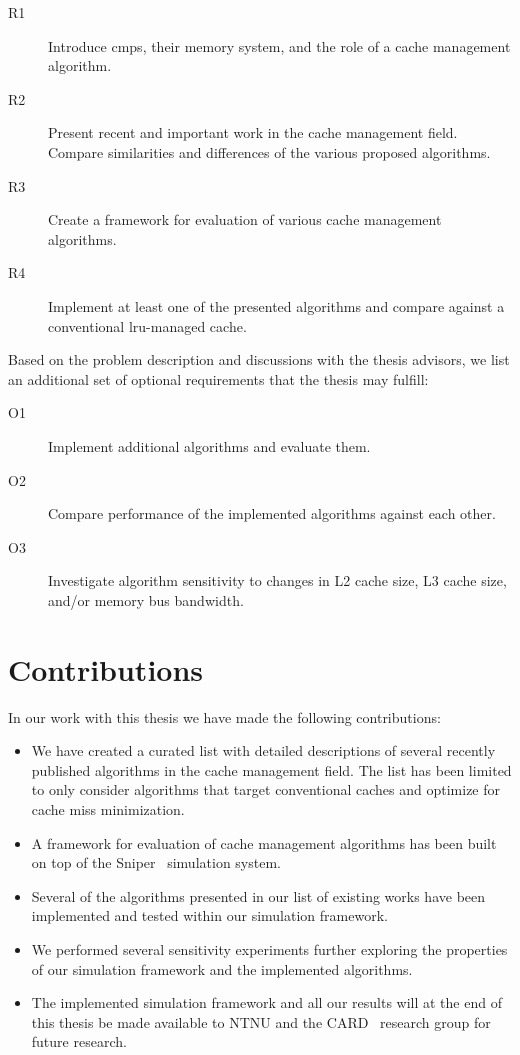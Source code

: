 \begin{description}
    \item[R1] Introduce \glspl{cmp}, their memory system, and the role of a cache management algorithm.
    \item[R2] Present recent and important work in the cache management field. Compare similarities and differences of the various proposed algorithms.
    \item[R3] Create a framework for evaluation of various cache management algorithms.
    \item[R4] Implement at least one of the presented algorithms and compare against a conventional \gls{lru}-managed cache.
\end{description}
Based on the problem description and discussions with the thesis advisors, we list an additional set of optional requirements that the thesis may fulfill:

\begin{description}
    \item[O1] Implement additional algorithms and evaluate them.
    \item[O2] Compare performance of the implemented algorithms against each other.
    \item[O3] Investigate algorithm sensitivity to changes in L2 cache size, L3 cache size, and/or memory bus bandwidth.
\end{description}

\section{Contributions}

In our work with this thesis we have made the following contributions:

\begin{itemize}
  \item We have created a curated list with detailed descriptions of several recently published algorithms in the cache management field. The list has been limited to only consider algorithms that target conventional caches and optimize for cache miss minimization.
  \item A framework for evaluation of cache management algorithms has been built on top of the Sniper~\cite{Carlson2011a} simulation system.
  \item Several of the algorithms presented in our list of existing works have been implemented and tested within our simulation framework.
  \item We performed several sensitivity experiments further exploring the properties of our simulation framework and the implemented algorithms.
  \item The implemented simulation framework and all our results will at the end of this thesis be made available to NTNU and the CARD~\cite{CARD2015} research group for future research.
\end{itemize}

